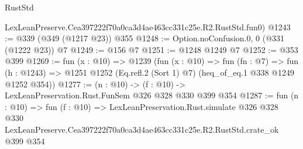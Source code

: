 \begin{lexlean}{RustStd}
\begin{coremodule}
    LexLeanPreserve.Cea397222f70a0ca3d4ae463cc331c25e.R2.RustStd.fun0)
@1243 := @339 (@349 (@1217 @23)) @355
@1248 := Option.noConfusion.{0, 0} (@331 (@1222 @23)) @7
@1249 := @156 @7
@1251 := @1248 @1249 @7
@1252 := @353 @399
@1269 := fun (x : @10) =>
  @1239
    (fun (x : @10) =>
    fun (fn : @7) =>
    fun (h : @1243) => @1251 @1252 (Eq.refl.{2} (Sort 1) @7) (heq_of_eq.{1} @338 @1249 @1252 @354))
@1277 := (n : @10) -> (f : @10) -> LexLeanPreservation.Rust.FunSem @326 @328 @330 @399 @354
@1287 := fun (n : @10) =>
  fun (f : @10) =>
  LexLeanPreservation.Rust.simulate
    @326
    @328
    @330
    LexLeanPreserve.Cea397222f70a0ca3d4ae463cc331c25e.R2.RustStd.crate_ok
    @399
    @354
\end{coremodule}
\end{lexlean}
